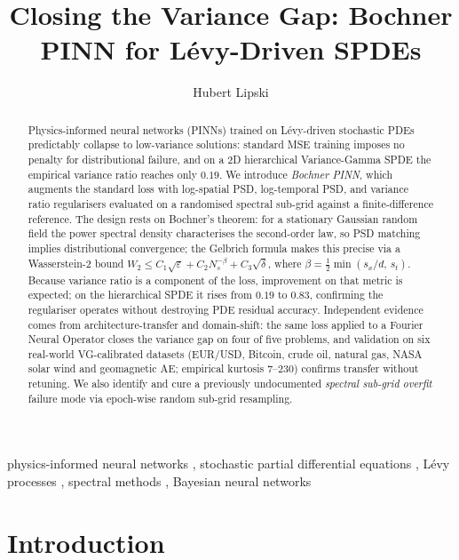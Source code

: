 \documentclass[review,12pt]{elsarticle}
\begin{document}
\begin{frontmatter}

\title{Closing the Variance Gap: Bochner PINN for L\'evy-Driven SPDEs}

\author{Hubert Lipski}

\begin{abstract}
Physics-informed neural networks (PINNs) trained on L\'evy-driven
stochastic PDEs predictably collapse to low-variance solutions:
standard MSE training imposes no penalty for distributional failure,
and on a 2D hierarchical Variance-Gamma SPDE the empirical variance
ratio reaches only \(0.19\).
We introduce \emph{Bochner PINN}, which augments the standard loss
with log-spatial PSD, log-temporal PSD, and variance ratio
regularisers evaluated on a randomised spectral sub-grid against a
finite-difference reference.
The design rests on Bochner's theorem: for a stationary Gaussian
random field the power spectral density characterises the second-order
law, so PSD matching implies distributional convergence; the Gelbrich
formula makes this precise via a Wasserstein-2 bound
\(W_2 \le C_1\sqrt{\varepsilon} + C_2 N_s^{-\beta} + C_3\sqrt{\delta}\),
where \(\beta = \tfrac{1}{2}\min(s_x/d,\,s_t)\).
Because variance ratio is a component of the loss, improvement on
that metric is expected; on the hierarchical SPDE it rises from
\(0.19\) to \(0.83\), confirming the regulariser operates without
destroying PDE residual accuracy.
Independent evidence comes from architecture-transfer and
domain-shift: the same loss applied to a Fourier Neural Operator
closes the variance gap on four of five problems, and validation on
six real-world VG-calibrated datasets (EUR/USD, Bitcoin, crude oil,
natural gas, NASA solar wind and geomagnetic AE; empirical kurtosis
\(7\)--\(230\)) confirms transfer without retuning.
We also identify and cure a previously undocumented \emph{spectral
sub-grid overfit} failure mode via epoch-wise random sub-grid
resampling.
\end{abstract}

\begin{keyword}
physics-informed neural networks \sep
stochastic partial differential equations \sep
L\'evy processes \sep
spectral methods \sep
Bayesian neural networks
\end{keyword}

\end{frontmatter}

\section{Introduction}
\label{sec:intro}
\end{document}
